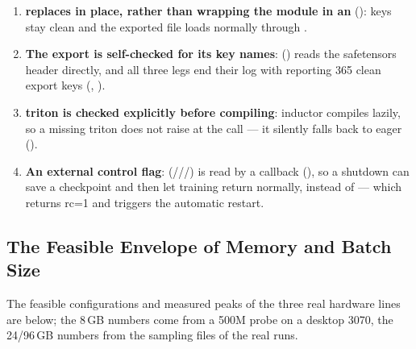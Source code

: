\documentclass[11pt,openany]{article}
\begin{document}
\begin{enumerate}
  \item \textbf{\linebreak[0] replaces  in place, rather than wrapping the
        module in an \linebreak[0]} (\linebreak[0]): \linebreak[0]
        keys stay clean and the exported file loads normally through \linebreak[0].
  \item \textbf{The export is self-checked for its key names}: \linebreak[0]
        (\linebreak[0]) reads the safetensors header directly, and all three legs end
        their log with \code{[verify]} reporting 365 clean export keys (,
        ).
  \item \textbf{triton is checked explicitly before compiling}: inductor compiles lazily, so a
        missing triton does not raise at the \linebreak[0] call --- it silently falls
        back to eager (\linebreak[0]).
  \item \textbf{An external control flag}: \linebreak[0]
        (//\linebreak[0]/) is read by a callback
        (\linebreak[0]), so a shutdown can save a checkpoint and then let training
        return normally, instead of  --- which returns rc=1 and triggers the
        automatic restart.
\end{enumerate}

\subsection{The Feasible Envelope of Memory and Batch Size}

The feasible configurations and measured peaks of the three real hardware lines are below; the
8\,GB numbers come from a 500M probe on a desktop 3070, the 24/96\,GB numbers from the sampling
files of the real runs.
\end{document}
